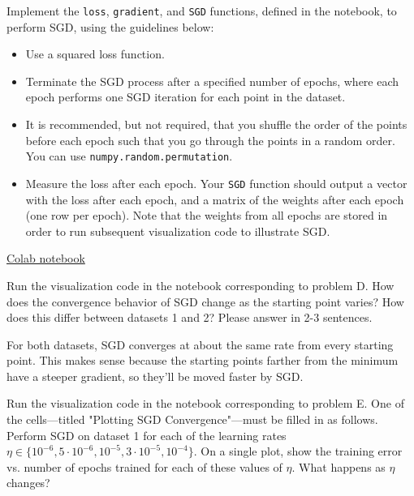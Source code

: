 \begin{problem}[6]
  Implement the \texttt{loss}, \texttt{gradient}, and \texttt{SGD} functions, defined in the notebook, to perform SGD, using the guidelines below:

  \begin{itemize}
    \item Use a squared loss function.
    \item Terminate the SGD process after a specified number of epochs, where each epoch performs one SGD iteration for each point in the dataset.
    \item It is recommended, but not required, that you shuffle the order of the points before each epoch such that you go through the points in a random order. You can use \texttt{numpy.random.permutation}.
    \item Measure the loss after each epoch. Your \texttt{SGD} function should output a vector with the loss after each epoch, and a matrix of the weights after each epoch (one row per epoch). Note that the weights from all epochs are stored in order to run subsequent visualization code to illustrate SGD.
  \end{itemize}
\end{problem}
\begin{solution}
  \href{https://colab.research.google.com/drive/1W4e4kxHNMzlaZKjbCx0NeMPYsud1PzPh?usp=sharing}{Colab notebook}
\end{solution}

\begin{problem}[2]
  Run the visualization code in the notebook corresponding to problem D. How does the convergence behavior of SGD change as the starting point varies? How does this differ between datasets 1 and 2? Please answer in 2-3 sentences.
\end{problem}
\begin{solution}
  For both datasets, SGD converges at about the same rate from every starting point.
  This makes sense because the starting points farther from the minimum have a steeper gradient, so they'll be moved faster by SGD.
\end{solution}

\begin{problem}[6]
  Run the visualization code in the notebook corresponding to problem E. One of the cells---titled "Plotting SGD Convergence"---must be filled in as follows. Perform SGD on dataset 1 for each of the learning rates $\eta \in \{10^{-6}, 5 \cdot 10^{-6}, 10^{-5}, 3 \cdot 10^{-5}, 10^{-4}\}$. On a single plot, show the training error vs. number of epochs trained for each of these values of $\eta$. What happens as $\eta$ changes?
\end{problem}

